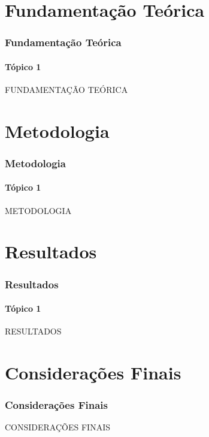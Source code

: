 \section{Fundamentação Teórica}

\begin{frame}
    \frametitle{Fundamentação Teórica}
    \framesubtitle{Tópico 1}
    \center

    FUNDAMENTAÇÃO TEÓRICA 

\end{frame}

\section{Metodologia}

\begin{frame}
    \frametitle{Metodologia}
    \framesubtitle{Tópico 1}

    \center

    METODOLOGIA

\end{frame}

\section{Resultados}

\begin{frame}
    \frametitle{Resultados}
    \framesubtitle{Tópico 1}
    \center

    RESULTADOS
    
\end{frame}


\section{Considerações Finais}

\begin{frame}
    \frametitle{Considerações Finais}
    \center

    CONSIDERAÇÕES FINAIS

\end{frame}
    
